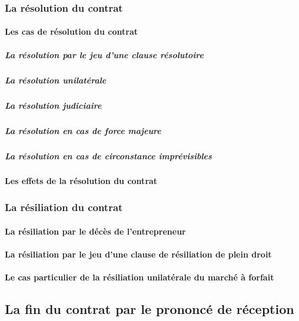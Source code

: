 			\subsubsection{La résolution du contrat}
			
				\paragraph{Les cas de résolution du contrat}
				
					\subparagraph{La résolution par le jeu d'une clause résolutoire}
					
					\subparagraph{La résolution unilatérale}
					
					\subparagraph{La résolution judiciaire}
					
					\subparagraph{La résolution en cas de force majeure}
					
					\subparagraph{La résolution en cas de circonstance imprévisibles}
				
				\paragraph{Les effets de la résolution du contrat}
			
			\subsubsection{La résiliation du contrat}
			
				\paragraph{La résiliation par le décès de l'entrepreneur}
				
				\paragraph{La résiliation par le jeu d'une clause de résiliation de plein droit}
				
				\paragraph{Le cas particulier de la résiliation unilatérale du marché à forfait}
		
		\subsection{La fin du contrat par le prononcé de réception}